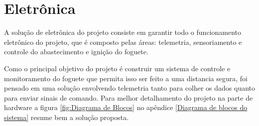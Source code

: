 \section{Eletrônica}
\par A solução de eletrônica do projeto consiste em garantir todo o funcionamento eletrônico do projeto, que é composto pelas áreas: telemetria, sensoriamento e controle do abastecimento e ignição do foguete.
\par Como o principal objetivo do projeto é construir um sistema de controle e monitoramento do foguete que permita isso ser feito a uma distancia segura, foi pensado em uma solução envolvendo telemetria tanto para colher os dados quanto para enviar sinais de comando. Para melhor detalhamento do projeto na parte de hardware a figura \ref{fig:Diagrama de Blocos} no apêndice \ref{Diagrama de blocos do sistema} resume bem a solução proposta.


